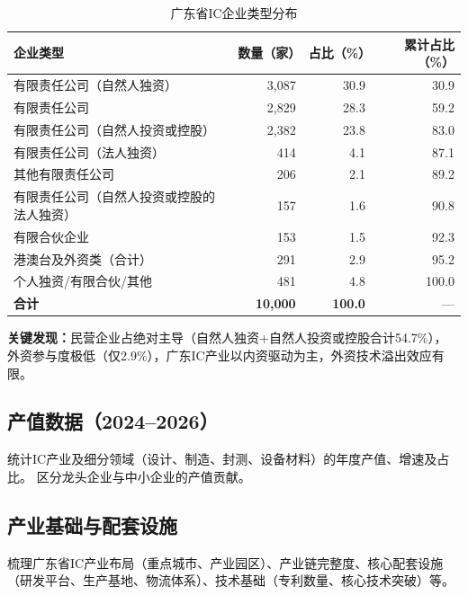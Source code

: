 \documentclass[12pt,a4paper]{ctexart}
\newcommand{\tableHeaderRow}{\rowcolor{tealPrimary}\color{white}}
\newcommand{\tableOddRow}{\rowcolor{mintBG}}
\newcommand{\tableEvenRow}{\rowcolor{white}}
\begin{document}
\begin{table}[H]
\centering
\caption{广东省IC企业类型分布}
\label{tab:enterprise_type}
\begin{tabular}{lrrr}
\toprule
\tableHeaderRow
\textbf{企业类型} & \textbf{数量（家）} & \textbf{占比（\%）} & \textbf{累计占比（\%）} \\
\midrule
\tableOddRow  有限责任公司（自然人独资）      & 3,087 & 30.9 & 30.9 \\
\tableEvenRow 有限责任公司                      & 2,829 & 28.3 & 59.2 \\
\tableOddRow  有限责任公司（自然人投资或控股）  & 2,382 & 23.8 & 83.0 \\
\tableEvenRow 有限责任公司（法人独资）          & 414   & 4.1  & 87.1 \\
\tableOddRow  其他有限责任公司                  & 206   & 2.1  & 89.2 \\
\tableEvenRow 有限责任公司（自然人投资或控股的法人独资） & 157 & 1.6 & 90.8 \\
\tableOddRow  有限合伙企业                      & 153   & 1.5  & 92.3 \\
\tableEvenRow 港澳台及外资类（合计）            & 291   & 2.9  & 95.2 \\
\tableOddRow  个人独资/有限合伙/其他            & 481   & 4.8  & 100.0 \\
\midrule
\tableEvenRow \textbf{合计} & \textbf{10,000} & \textbf{100.0} & — \\
\bottomrule
\end{tabular}
\end{table}

\textbf{关键发现：}民营企业占绝对主导（自然人独资+自然人投资或控股合计54.7\%），
外资参与度极低（仅2.9\%），广东IC产业以内资驱动为主，外资技术溢出效应有限。

\subsection{产值数据（2024--2026）}
\label{sec:output}

统计IC产业及细分领域（设计、制造、封测、设备材料）的年度产值、增速及占比。
区分龙头企业与中小企业的产值贡献。

\subsection{产业基础与配套设施}
\label{sec:infrastructure}

梳理广东省IC产业布局（重点城市、产业园区）、产业链完整度、核心配套设施
（研发平台、生产基地、物流体系）、技术基础（专利数量、核心技术突破）等。
\end{document}
